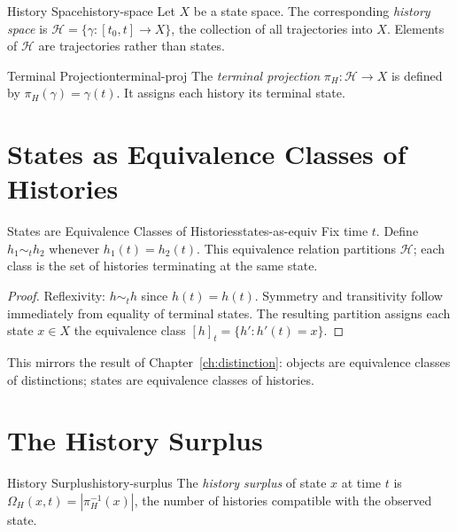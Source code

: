 \documentclass[12pt,twoside,openright]{book}
\newcommand{\hist}{\mathcal{H}}
\begin{document}
\begin{definition}{History Space}{history-space}
  Let $X$ be a state space. The corresponding
  \emph{history space} is
  $\hist = \{\gamma : [t_0, t] \to X\}$,
  the collection of all trajectories into $X$.
  Elements of $\hist$ are trajectories rather than states.
\end{definition}

\begin{definition}{Terminal Projection}{terminal-proj}
  The \emph{terminal projection}
  $\pi_H: \hist \to X$ is defined by
  $\pi_H(\gamma) = \gamma(t)$.
  It assigns each history its terminal state.
\end{definition}

\section{States as Equivalence Classes of Histories}
\label{sec:ch4-equiv}

\begin{proposition}{States are Equivalence Classes of
  Histories}{states-as-equiv}
  Fix time $t$. Define $h_1 \sim_t h_2$ whenever
  $h_1(t) = h_2(t)$. This equivalence relation
  partitions $\hist$; each class is the set of histories
  terminating at the same state.
\end{proposition}

\begin{proof}
  Reflexivity: $h \sim_t h$ since $h(t) = h(t)$.
  Symmetry and transitivity follow immediately from
  equality of terminal states.
  The resulting partition assigns each state $x \in X$
  the equivalence class $[h]_t = \{h' : h'(t) = x\}$.
\end{proof}

This mirrors the result of Chapter~\ref{ch:distinction}:
objects are equivalence classes of distinctions; states are
equivalence classes of histories.

\section{The History Surplus}
\label{sec:ch4-surplus}

\begin{definition}{History Surplus}{history-surplus}
  The \emph{history surplus} of state $x$ at time $t$ is
  $\Omega_H(x,t) = |\pi_H^{-1}(x)|$,
  the number of histories compatible with the observed state.
\end{definition}
\end{document}
